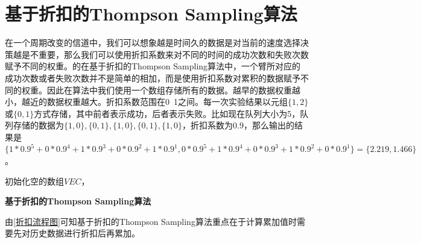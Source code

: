 \section{基于折扣的Thompson Sampling算法}
在一个周期改变的信道中，我们可以想象越是时间久的数据是对当前的速度选择决策越是不重要，那么我们可以使用折扣系数来对不同的时间的成功次数和失败次数赋予不同的权重。的在基于折扣的Thompson Sampling算法中，一个臂所对应的成功次数或者失败次数并不是简单的相加，而是使用折扣系数对累积的数据赋予不同的权重。因此在算法中我们使用一个数组存储所有的数据。越早的数据权重越小，越近的数据权重越大。折扣系数范围在0~1之间。每一次实验结果以元组$\{1,2\}$或$\{0,1\}$方式存储，其中前者表示成功，后者表示失败。比如现在队列大小为5，队列存储的数据为$\{1,0\},\{0,1\},\{1,0\},\{0,1\},\{1,0\}$，折扣系数为0.9，那么输出的结果是$\{1*0.9^5+0*0.9^4+1*0.9^3+0*0.9^2+1*0.9^1,0*0.9^5+1*0.9^4+0*0.9^3+1*0.9^2+0*0.9^1\} = \{2.219,1.466\}$。
\begin{algorithm}[h]
	初始化空的数组$VEC$，
	\caption{\textbf{基于折扣的Thompson Sampling算法}}
	\label{sgd}
\end{algorithm}

由\ref{折扣流程图}可知基于折扣的Thompson Sampling算法重点在于计算累加值时需要先对历史数据进行折扣后再累加。

